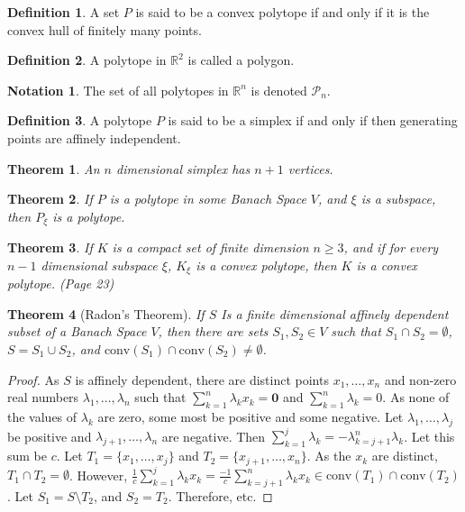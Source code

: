 \documentclass[oneside]{book}
\newtheorem{theorem}{Theorem}[section]
\theoremstyle{definition}
\newtheorem{definition}{Definition}[section]
\newtheorem{notation}{Notation}[section]
\newcommand*\B[1]{\mathbf{#1}}
\begin{document}
\begin{definition}
A set $P$ is said to be a convex polytope if and only if it is the convex hull of finitely many points.
\end{definition}

\begin{definition}
A polytope in $\mathbb{R}^2$ is called a polygon.
\end{definition}

\begin{notation}
The set of all polytopes in $\mathbb{R}^n$ is denoted $\mathscr{P}_n$.
\end{notation} 

\begin{definition}
A polytope $P$ is said to be a simplex if and only if then generating points are affinely independent.
\end{definition}

\begin{theorem}
An $n$ dimensional simplex has $n+1$ vertices.
\end{theorem}

\begin{theorem}
If $P$ is a polytope in some Banach Space $V$, and $\xi$ is a subspace, then $P_{\xi}$ is a polytope.
\end{theorem}

\begin{theorem}
If $K$ is a compact set of finite dimension $n\geq 3$, and if for every $n-1$ dimensional subspace $\xi$, $K_{\xi}$ is a convex polytope, then $K$ is a convex polytope. (Page 23)
\end{theorem}

\begin{theorem}[Radon's Theorem]
If $S$ Is a finite dimensional affinely dependent subset of a Banach Space $V$, then there are sets $S_1,S_2\in V$ such that $S_1\cap S_2 = \emptyset$, $S=S_1\cup S_2$, and $\textrm{conv}(S_1)\cap \textrm{conv}(S_2) \ne \emptyset$.
\end{theorem}
\begin{proof}
As $S$ is affinely dependent, there are distinct points $x_1,\hdots,x_n$ and non-zero real numbers $\lambda_1,\hdots,\lambda_n$ such that $\sum_{k=1}^{n}\lambda_k x_k= \B{0}$ and $\sum_{k=1}^{n}\lambda_k = 0$. As none of the values of $\lambda_k$ are zero, some most be positive and some negative. Let $\lambda_1,\hdots, \lambda_j$ be positive and $\lambda_{j+1},\hdots, \lambda_n$ are negative. Then $\sum_{k=1}^{j} \lambda_k = - \lambda_{k=j+1}^{n}\lambda_k$. Let this sum be $c$. Let $T_1 = \{x_1,\hdots, x_j\}$ and $T_2=\{x_{j+1},\hdots, x_{n}\}$. As the $x_k$ are distinct, $T_1\cap T_2 = \emptyset$. However, $\frac{1}{c}\sum_{k=1}^{j}\lambda_k x_k = \frac{-1}{c}\sum_{k=j+1}^{n} \lambda_k x_k \in\textrm{conv}(T_1)\cap \textrm{conv}(T_2)$. Let $S_1 = S\setminus T_2$, and $S_2 = T_2$. Therefore, etc.
\end{proof}
\end{document}
